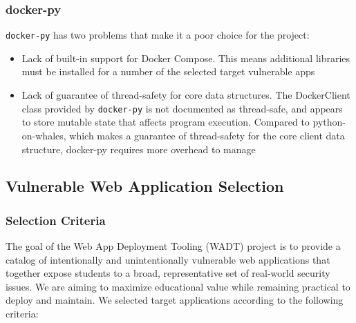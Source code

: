 \documentclass[12pt]{article}
\begin{document}
\subsubsection{docker-py}
\texttt{docker-py} has two problems that make it a poor choice for the project:
\begin{itemize}
	\item Lack of built-in support for Docker Compose. This means additional libraries must be installed for a number of the selected target vulnerable apps
	\item Lack of guarantee of thread-safety for core data structures. The DockerClient class provided by \texttt{docker-py} is not documented as thread-safe, and appears to store mutable state that affects program execution. Compared to python-on-whales, which makes a guarantee of thread-safety for the core client data structure, docker-py requires more overhead to manage
\end{itemize}

\subsection{Vulnerable Web Application Selection}

\subsubsection{Selection Criteria}
The goal of the Web App Deployment Tooling (WADT) project is to provide a catalog of intentionally and unintentionally vulnerable web applications that together expose students to a broad, representative set of real-world security issues. We are aiming to maximize educational value while remaining practical to deploy and maintain. We selected target applications according to the following criteria:
\end{document}
